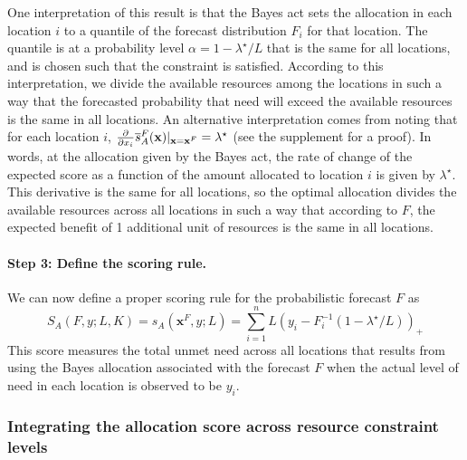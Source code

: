 \documentclass{article}
\begin{document}
One interpretation of this result is that the Bayes act sets the allocation in each location $i$ to a quantile of the forecast distribution $F_i$ for that location. The quantile is at a probability level $\alpha = 1 - \lambda^{\star}/L$ that is the same for all locations, and is chosen such that the constraint is satisfied. According to this interpretation, we divide the available resources among the locations in such a way that the forecasted probability that need will exceed the available resources is the same in all locations.
An alternative interpretation comes from noting that for each location $i$, $\frac{\partial}{\partial x_i} \overline{s}_A^F(\mathbf{x}) \vert_{\mathbf{x}=\mathbf{x}^F} = \lambda^{\star}$ (see the supplement for a proof).
In words, at the allocation given by the Bayes act, the rate of change of the expected score as a function of the amount allocated to location $i$ is given by $\lambda^{\star}$.
This derivative is the same for all locations, so the optimal allocation divides the available resources across all locations in such a way that according to $F$, the expected benefit of 1 additional unit of resources is the same in all locations.


\paragraph{Step 3: Define the scoring rule.} We can now define a proper scoring rule for the probabilistic forecast $F$ as
\begin{equation}
S_A(F, y; L, K) = s_A(\mathbf{x}^F, y; L) = \sum_{i=1}^n L (y_i - F_i^{-1}(1 - \lambda^{\star}/L))_+
\end{equation}
This score measures the total unmet need across all locations that results from using the Bayes allocation associated with the forecast $F$ when the actual level of need in each location is observed to be $y_i$.

\subsubsection{Integrating the allocation score across resource constraint levels}
\label{sec:methods.detailed.integrated_allocation}
\end{document}
